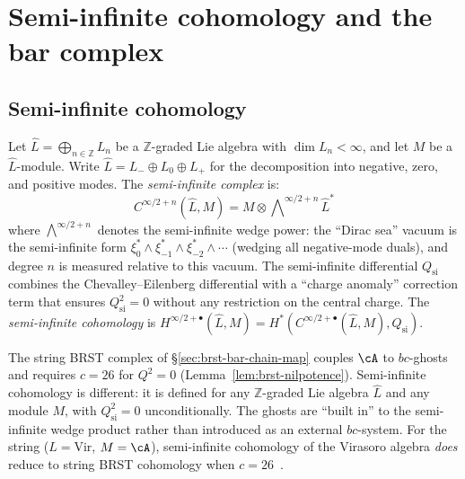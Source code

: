 \section{Semi-infinite cohomology and the bar complex}
\label{sec:semi-infinite-bar}

\subsection{Semi-infinite cohomology}

\begin{definition}
\label{def:semi-infinite-cohomology}
Let $\widehat{L} = \bigoplus_{n \in \mathbb{Z}} L_n$ be a
$\mathbb{Z}$-graded Lie algebra with $\dim L_n < \infty$, and let
$M$ be a $\widehat{L}$-module. Write
$\widehat{L} = L_- \oplus L_0 \oplus L_+$ for the decomposition
into negative, zero, and positive modes. The \emph{semi-infinite
complex} is:
\[
C^{\infty/2+n}(\widehat{L}, M)
= M \otimes \textstyle\bigwedge\nolimits^{\infty/2+n}\! \widehat{L}^*
\]
where $\bigwedge^{\infty/2+n}$ denotes the semi-infinite wedge
power: the ``Dirac sea'' vacuum is the semi-infinite form
$\xi_0^* \wedge \xi_{-1}^* \wedge \xi_{-2}^* \wedge \cdots$
(wedging all negative-mode duals), and degree $n$ is measured
relative to this vacuum. The semi-infinite differential
$Q_{\mathrm{si}}$ combines the Chevalley--Eilenberg differential
with a ``charge anomaly'' correction term that ensures
$Q_{\mathrm{si}}^2 = 0$ without any restriction on the central charge.
The \emph{semi-infinite cohomology} is
$H^{\infty/2+\bullet}(\widehat{L}, M) =
H^*(C^{\infty/2+\bullet}(\widehat{L}, M), Q_{\mathrm{si}})$.
\end{definition}

\begin{remark}
\label{rem:semi-infinite-vs-brst}
The string BRST complex of \S\ref{sec:brst-bar-chain-map} couples
$\cA$ to $bc$-ghosts and requires $c = 26$ for $Q^2 = 0$
(Lemma~\ref{lem:brst-nilpotence}). Semi-infinite cohomology is
different: it is defined for any $\mathbb{Z}$-graded Lie algebra
$\widehat{L}$ and any module $M$, with $Q_{\mathrm{si}}^2 = 0$
unconditionally. The ghosts are ``built in'' to the semi-infinite
wedge product rather than introduced as an external $bc$-system.
For the string ($\widehat{L} = \mathrm{Vir}$, $M = \cA$),
semi-infinite cohomology of the Virasoro algebra \emph{does}
reduce to string BRST cohomology when $c = 26$~\cite{FGZ86}.
\end{remark}

